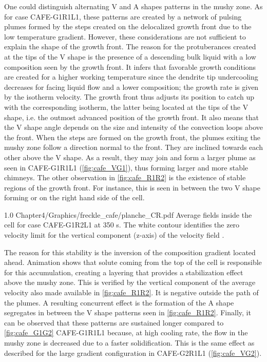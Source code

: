 One could distinguish alternating V and A shapes patterns in the mushy zone. As for case CAFE-G1R1L1, these patterns are created by a network of pulsing 
plumes formed by the steps created on the delocalized growth front due to the low temperature gradient. However, these 
considerations are not sufficient to explain the shape of the growth front. The reason for the protuberances created at 
the tips of the V shape is the presence of a descending bulk liquid with a low composition seen by the growth front. It 
infers that favorable growth conditions are created for a higher working temperature since the dendrite tip undercooling 
decreases for facing liquid flow and a lower composition; the growth rate is given by the isotherm velocity. The growth 
front thus adjusts its position to catch up with the corresponding isotherm, the latter being located at the tips of the 
V shape, i.e. the outmost advanced position of the growth front. It also means that the V shape angle depends on the size 
and intensity of the convection loops above the front. When the steps are formed on the growth front, the plumes exiting 
the mushy zone follow a direction normal to the front. They are inclined towards each other above the V shape. As a result, 
they may join and form a larger plume as seen in CAFE-G1R1L1 (\cref{fig:cafe_VG1}), thus forming larger and more stable chimneys. 
The other observation in \cref{fig:cafe_R1R2} is the existence of stable regions of the growth front. For instance, this is seen 
in between the two V shape forming or on the right hand side of the cell. 

\begin{figureth}
{1.0}
{Chapter4/Graphics/freckle_cafe/planche_CR.pdf}
{Average fields inside the cell for case CAFE-G1R2L1 at 350 s. 
The white contour identifies the zero velocity limit for the vertical component (z-axis) of the velocity field .}
\label{fig:cafe_R1R2}
\end{figureth}

The reason for this stability is the inversion of 
the composition gradient located ahead. Animation shows that solute coming from the top of the cell is responsible for this 
accumulation, creating a layering that provides a stabilization effect above the mushy zone. This is verified by the vertical 
component of the average velocity also made available in \cref{fig:cafe_R1R2}. It is negative outside the path of the plumes. A resulting 
concurrent effect is the formation of the A shape segregates in between the V shape patterns seen in \cref{fig:cafe_R1R2}. Finally, it can 
be observed that these patterns are sustained longer compared to \cref{fig:cafe_G1G2} CAFE-G1R1L1 because, at high cooling rate, 
the flow in the mushy zone is decreased due to a faster solidification. This is the same effect as described for the large gradient 
configuration in CAFE-G2R1L1 (\cref{fig:cafe_VG2}).

